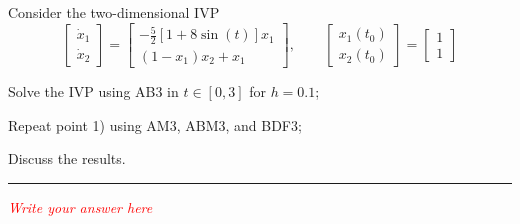 \documentclass[11pt,a4paper,oneside]{article}
\newcommand{\tr}{\textcolor{red}}
\begin{document}
Consider the two-dimensional IVP 
$$\begin{bmatrix}\dot{x}_1 \\ \dot{x}_2\end{bmatrix}=\begin{bmatrix}-\frac{5}{2}\left[1+8\sin(t)\right]x_1 \\ (1-x_1)x_2+x_1\end{bmatrix}, \qquad \begin{bmatrix} x_1(t_0)\\ x_2(t_0)\end{bmatrix}=\begin{bmatrix} 1\\ 1\end{bmatrix}$$
\begin{enumerate*}[label=\arabic*)]
    \item Solve the IVP using AB3 in $t\in[0,3]$ for $h=0.1$;
    \item Repeat point 1) using AM3, ABM3, and BDF3;
    \item Discuss the results.
\end{enumerate*}

\medskip \hrule \medskip



\tr{\textit{Write your answer here}}
\end{document}
